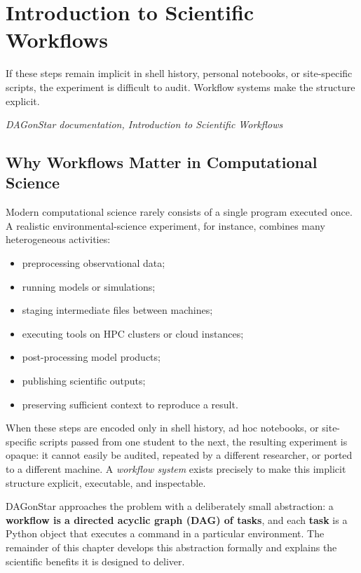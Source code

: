 \chapter{Introduction to Scientific Workflows}
\label{ch:introduction}

\epigraph{If these steps remain implicit in shell history, personal notebooks,
or site-specific scripts, the experiment is difficult to audit. Workflow
systems make the structure explicit.}{\textit{DAGonStar documentation,
Introduction to Scientific Workflows}}

\section{Why Workflows Matter in Computational Science}

Modern computational science rarely consists of a single program executed
once. A realistic environmental-science experiment, for instance, combines
many heterogeneous activities:

\begin{itemize}[leftmargin=1.4em]
  \item preprocessing observational data;
  \item running models or simulations;
  \item staging intermediate files between machines;
  \item executing tools on HPC clusters or cloud instances;
  \item post-processing model products;
  \item publishing scientific outputs;
  \item preserving sufficient context to reproduce a result.
\end{itemize}

When these steps are encoded only in shell history, ad hoc notebooks, or
site-specific scripts passed from one student to the next, the resulting
experiment is opaque: it cannot easily be audited, repeated by a different
researcher, or ported to a different machine. A \emph{workflow system} exists
precisely to make this implicit structure explicit, executable, and
inspectable.

DAGonStar approaches the problem with a deliberately small abstraction: a
\textbf{workflow is a directed acyclic graph (DAG) of tasks}, and each
\textbf{task} is a Python object that executes a command in a particular
environment. The remainder of this chapter develops this abstraction
formally and explains the scientific benefits it is designed to deliver.

